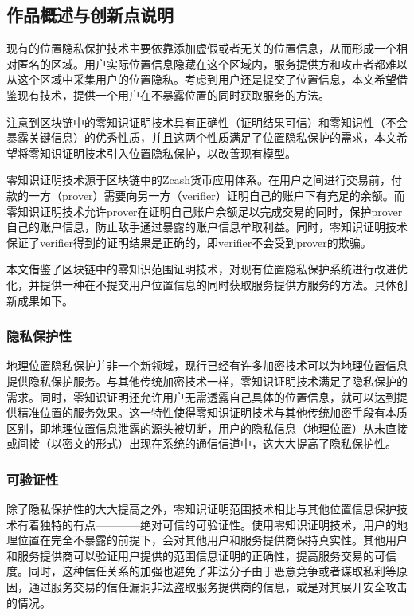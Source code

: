 \documentclass[zihao=-4]{ctexart}
\begin{document}
\subsection{作品概述与创新点说明}
现有的位置隐私保护技术主要依靠添加虚假或者无关的位置信息，从而形成一个相对匿名的区域。用户实际位置信息隐藏在这个区域内，服务提供方和攻击者都难以从这个区域中采集用户的位置隐私。考虑到用户还是提交了位置信息，本文希望借鉴现有技术，提供一个用户在不暴露位置的同时获取服务的方法。
\par 
注意到区块链中的零知识证明技术具有正确性（证明结果可信）和零知识性（不会暴露关键信息）的优秀性质，并且这两个性质满足了位置隐私保护的需求，本文希望将零知识证明技术引入位置隐私保护，以改善现有模型。
\par 
零知识证明技术源于区块链中的Zcash货币应用体系。在用户之间进行交易前，付款的一方（prover）需要向另一方（verifier）证明自己的账户下有充足的余额。而零知识证明技术允许prover在证明自己账户余额足以完成交易的同时，保护prover自己的账户信息，防止敌手通过暴露的账户信息牟取利益。同时，零知识证明技术保证了verifier得到的证明结果是正确的，即verifier不会受到prover的欺骗。
\par 
本文借鉴了区块链中的零知识范围证明技术，对现有位置隐私保护系统进行改进优化，并提供一种在不提交用户位置信息的同时获取服务提供方服务的方法。具体创新成果如下。

\subsubsection{隐私保护性}
地理位置隐私保护并非一个新领域，现行已经有许多加密技术可以为地理位置信息提供隐私保护服务。与其他传统加密技术一样，零知识证明技术满足了隐私保护的需求。同时，零知识证明还允许用户无需透露自己具体的位置信息，就可以达到提供精准位置的服务效果。这一特性使得零知识证明技术与其他传统加密手段有本质区别，即地理位置信息泄露的源头被切断，用户的隐私信息（地理位置）从未直接或间接（以密文的形式）出现在系统的通信信道中，这大大提高了隐私保护性。

\subsubsection{可验证性}
除了隐私保护性的大大提高之外，零知识证明范围技术相比与其他位置信息保护技术有着独特的有点————绝对可信的可验证性。使用零知识证明技术，用户的地理位置在完全不暴露的前提下，会对其他用户和服务提供商保持真实性。其他用户和服务提供商可以验证用户提供的范围信息证明的正确性，提高服务交易的可信度。同时，这种信任关系的加强也避免了非法分子由于恶意竞争或者谋取私利等原因，通过服务交易的信任漏洞非法盗取服务提供商的信息，或是对其展开安全攻击的情况。
\end{document}
